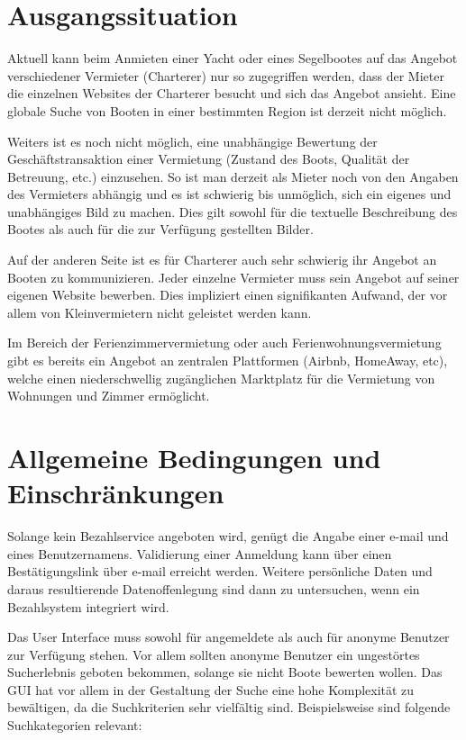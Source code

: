 \documentclass[12pt]{article}
\theoremstyle{definition}
\begin{document}
\pagebreak

\section{Ausgangssituation}
Aktuell kann beim Anmieten einer Yacht oder eines Segelbootes auf das Angebot verschiedener Vermieter (Charterer) nur so zugegriffen werden, dass der Mieter die einzelnen Websites der Charterer besucht und sich das Angebot ansieht. Eine globale Suche von Booten in einer bestimmten Region ist derzeit nicht möglich.

Weiters ist es noch nicht möglich, eine unabhängige Bewertung der Geschäfts\-trans\-aktion einer Vermietung (Zustand des Boots, Qualität der Betreuung, etc.) einzusehen. So ist man derzeit als Mieter noch von den Angaben des Vermieters abhängig und es ist schwierig bis unmöglich, sich ein eigenes und unabhängiges Bild zu machen. Dies gilt sowohl für die textuelle Beschreibung des Bootes als auch für die zur Verfügung gestellten Bilder.

Auf der anderen Seite ist es für Charterer auch sehr schwierig ihr Angebot an Booten zu kommunizieren. Jeder einzelne Vermieter muss sein Angebot auf seiner eigenen Website bewerben. Dies impliziert einen signifikanten Aufwand, der vor allem von Kleinvermietern nicht geleistet werden kann.

Im Bereich der Ferienzimmervermietung oder auch Ferienwohnungsvermietung gibt es bereits ein Angebot an zentralen Plattformen (Airbnb, HomeAway, etc), welche einen niederschwellig zugänglichen Marktplatz für die Vermietung von Wohnungen und Zimmer ermöglicht.

\pagebreak

\section{Allgemeine Bedingungen und Einschränkungen}
Solange kein Bezahlservice angeboten wird, genügt die Angabe einer e-mail und eines Benutzernamens. Validierung einer Anmeldung kann über einen Bestätigungslink über e-mail erreicht werden. Weitere persönliche Daten und daraus resultierende Datenoffenlegung sind dann zu untersuchen, wenn ein Bezahlsystem integriert wird.

Das User Interface muss sowohl für angemeldete als auch für anonyme Benutzer zur Verfügung stehen. Vor allem sollten anonyme Benutzer ein ungestörtes Sucherlebnis geboten bekommen, solange sie nicht Boote bewerten wollen. Das GUI hat vor allem in der Gestaltung der Suche eine hohe Komplexität zu bewältigen, da die Suchkriterien sehr vielfältig sind. Beispielsweise sind folgende Suchkategorien relevant:
\end{document}
